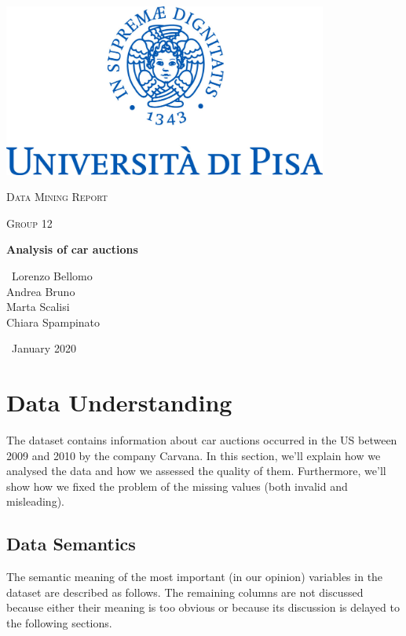 \documentclass{article}
\begin{document}
	
	\begin{titlepage}
		\centering
		\includegraphics[width=0.80\textwidth]{marchio.jpg}\par\vspace{2cm}
		{\scshape\LARGE Data Mining Report \par}
		\vspace{1cm}
		{\scshape\Large Group 12 \\ \par}
		\vspace{1cm}
		{\huge\bfseries Analysis of car auctions\par}
		\vspace{2cm}
		{\Large\ Lorenzo Bellomo \\ Andrea Bruno \\ Marta Scalisi \\ Chiara Spampinato\par}
		\vspace{4cm}
		{\Large\ January 2020\par}
	\end{titlepage}
	
	
	
	
	\section{Data Understanding}
	The dataset contains information about car auctions occurred in the US between 2009 and 2010 by the company Carvana. In this section, we'll explain how we analysed the data and how we assessed the quality of them. Furthermore, we'll show how we fixed the problem of the missing values (both invalid and misleading).
	
	\subsection{Data Semantics}
	\label{sec:dataSemantics}
	The semantic meaning of the most important (in our opinion) variables in the dataset are described as follows. The remaining columns are not discussed because either their meaning is too obvious or because its discussion is delayed to the following sections.
	
\end{document}
